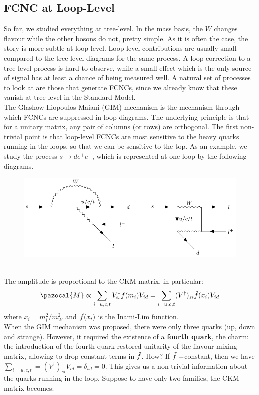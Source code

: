 \documentclass[../main.tex]{subfiles}
\begin{document}
\subsection{FCNC at Loop-Level}
So far, we studied everything at tree-level. In the mass basis, the $W$ changes flavour while the other bosons do not, pretty simple. As it is often the case, the story is more subtle at loop-level. Loop-level contributions are usually small compared to the tree-level diagrams for the same process. A loop correction to a tree-level process is hard to observe, while a small effect which is the only source of signal has at least a chance of being measured well. A
natural set of processes to look at are those that generate FCNCs, since we already know that these vanish at tree-level in the Standard Model.\\
The Glashow-Iliopoulos-Maiani (GIM) mechanism is the mechanism through which FCNCs are suppressed in loop diagrams. The underlying principle is that for a unitary matrix, any pair of columns (or rows) are orthogonal. The first non-trivial point is that
loop-level FCNCs are most sensitive to the heavy quarks running in the loops, so that we can be sensitive to the top. As an example, we study the process $s\to de^+e^-$, which is represented at one-loop by the following diagrams.\\
\begin{figure}[h]
    \centering
    \includegraphics{Images/gim.pdf}
    \caption*{}
\end{figure}\\
\newline
The amplitude is proportional to the CKM matrix, in particular:
\[
\pazocal{M}\propto\sum_{i=u,c,t}V_{is}^*f(m_i)V_{id}=\sum_{i=u,c,t}(V^\dagger)_{si}\Tilde{f}(x_i)V_{id}
\]
where $x_i=m_i^2/m_W^2$ and $\Tilde{f}(x_i)$ is the Inami-Lim function.\\
When the GIM mechanism was proposed, there were only three quarks (up, down and strange). However, it required the existence of a \textbf{fourth quark}, the charm: the introduction of the fourth quark restored unitarity of the flavour mixing matrix, allowing to drop constant terms in $\Tilde{f}$. How? If $\Tilde{f}=$constant, then we have $\sum_{i=u,c,t}=(V^\dagger)_{si}V_{id}=\delta_{sd}=0$. This gives us a non-trivial information about the quarks running in the loop. Suppose to have only two families, the CKM matrix becomes:
\end{document}
